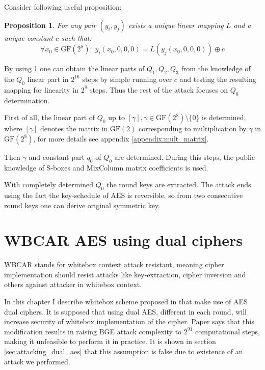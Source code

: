 \documentclass[11pt,oneside,final]{fithesis2}
\newtheorem{myprop}{Proposition}
\newcommand{\gfe}{\ensuremath{\text{GF}\left(2^8\right)}}
\newcommand{\gf}{\ensuremath{\text{GF}\left(2\right)}}
\begin{document}
    Consider following useful proposition:
    \begin{myprop}\label{prop:bge_prop1}
     For any pair $\left(y_i, y_j\right)$ exists a unique linear mapping $L$ and a unique constant $c$ such that:
     \begin{equation}
	\forall x_0 \in \gfe:\; y_i\left(x_0, 0, 0, 0\right) = L \left(y_j \left(x_0, 0, 0, 0 \right) \right) \oplus c
     \end{equation}
    \end{myprop}
    
    By using \ref{prop:bge_prop1} one can obtain the linear parts of $Q_1, Q_2, Q_3$ from the knowledge of the $Q_0$ linear part in $2^{16}$ steps by simple
    running over $c$ and testing the resulting mapping for linearity in $2^8$ steps. Thus the rest of the attack focuses on $Q_0$ determination.
    
    First of all, the linear part of $Q_0$ up to $\left[\gamma\right], \gamma \in \gfe \setminus \{0\}$ is determined, where $\left[\gamma\right]$ denotes the
    matrix in $\gf$ corresponding to multiplication by $\gamma$ in $\gfe$, for more details see appendix \ref{appendix:mult_matrix}.
    
    Then $\gamma$ and constant part $q_0$ of $Q_0$ are determined. During this steps, the public knowledge of S-boxes and MixColumn matrix coefficients is used.
    
    With completely determined $Q_0$ the round keys are extracted.
    The attack ends using the fact the key-schedule of AES is reversible, so from two consecutive round keys one can derive original symmetric key.
    
\chapter{WBCAR AES using dual ciphers}\label{sec:wb_dual_aes_sec}
    WBCAR stands for whitebox context attack resistant, meaning cipher implementation should resist attacks like key-extraction, cipher inversion
    and others against attacker in whitebox context.
    
    In this chapter I describe whitebox scheme proposed in \citep{Karroumi:2010:PWA:2041036.2041060} that make use of AES dual ciphers. It is supposed 
    that using dual AES, different in each round, will increase security of whitebox implementation of the cipher. Paper says that this modification
    results in raising BGE attack \citep{Billet:2004:CWB:2080787.2080809} complexity to $2^{91}$ computational steps, making it unfeasible to perform it in practice. It is shown in section
    \ref{sec:attacking_dual_aes} that this assumption is false due to existence of an attack we performed.
    
\end{document}
